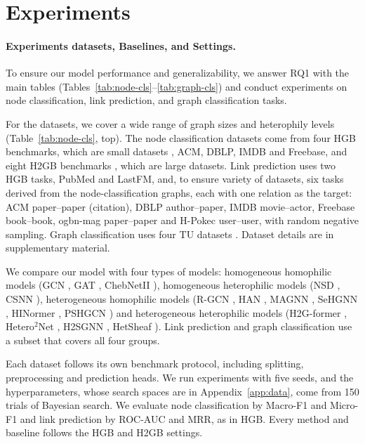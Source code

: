 \documentclass{article}
\begin{document}
\section{Experiments}
\label{sec:experiments}
\paragraph{Experiments datasets, Baselines, and Settings.}
To ensure our model performance and generalizability, we answer RQ1 with the main tables (Tables~\ref{tab:node-cls}--\ref{tab:graph-cls}) and conduct experiments on node classification, link prediction, and graph classification tasks.

For the datasets, we cover a wide range of graph sizes and heterophily levels (Table~\ref{tab:node-cls}, top). The node classification datasets come from four HGB benchmarks, which are small datasets \cite{lv2021hgb}, ACM, DBLP, IMDB and Freebase, and eight H2GB benchmarks \cite{lin2025heterophily}, which are large datasets. Link prediction uses two HGB tasks, PubMed and LastFM, and, to ensure variety of datasets, six tasks derived from the node-classification graphs, each with one relation as the target: ACM paper--paper (citation), DBLP author--paper, IMDB movie--actor, Freebase book--book, ogbn-mag paper--paper and H-Pokec user--user, with random negative sampling. Graph classification uses four TU datasets \cite{morris2020tudataset}. Dataset details are in supplementary material.

We compare our model with four types of models: homogeneous homophilic models (GCN \cite{kipf2017gcn}, GAT \cite{velickovic2018gat}, ChebNetII \cite{he2022chebnetii}), homogeneous heterophilic models (NSD \cite{bodnar2022neural}, CSNN \cite{ribeiro2026cooperative}), heterogeneous homophilic models (R-GCN \cite{schlichtkrull2018rgcn}, HAN \cite{wang2019han}, MAGNN \cite{fu2020magnn}, SeHGNN \cite{yang2023sehgnn}, HINormer \cite{mao2023hinormer}, PSHGCN \cite{he2024spectral}) and heterogeneous heterophilic models (H2G-former \cite{lin2025heterophily}, Hetero$^2$Net \cite{li2025hetero2net}, H2SGNN \cite{lu2026addressing}, HetSheaf \cite{braithwaite2024heterogeneous}). Link prediction and graph classification use a subset that covers all four groups.

Each dataset follows its own benchmark protocol, including splitting, preprocessing and prediction heads. We run experiments with five seeds, and the hyperparameters, whose search spaces are in Appendix~\ref{app:data}, come from 150 trials of Bayesian search. We evaluate node classification by Macro-F1 and Micro-F1 and link prediction by ROC-AUC and MRR, as in HGB. Every method and baseline follows the HGB and H2GB settings.
\end{document}
